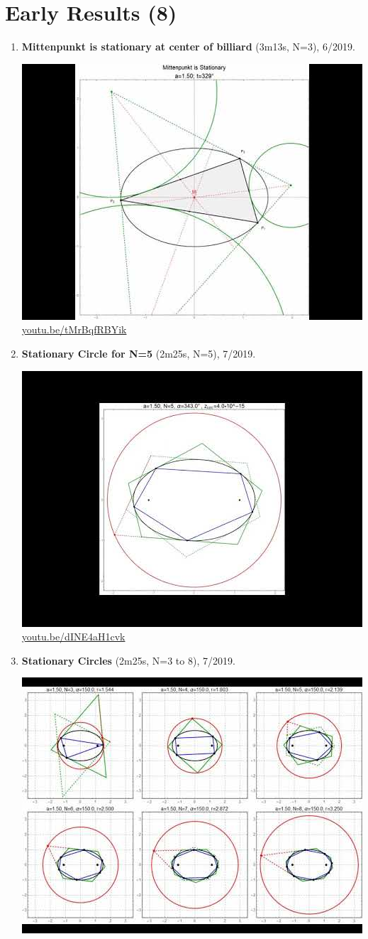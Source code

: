 \documentclass[12pt]{amsart}
\begin{document}
\section{Early Results (8)}

\begin{enumerate}[resume]
\item \textbf{Mittenpunkt is stationary at center of billiard} (3m13s, N=3), 6/2019. 
\begin{center}\includegraphics[width=.5\textwidth]{pics/tMrBqfRBYik.jpg} \\ 
\href{https://youtu.be/tMrBqfRBYik}{\url{youtu.be/tMrBqfRBYik}}\end{center}
% 
\item \textbf{Stationary Circle for N=5} (2m25s, N=5), 7/2019. 
\begin{center}\includegraphics[width=.5\textwidth]{pics/dINE4aH1cvk.jpg} \\ 
\href{https://youtu.be/dINE4aH1cvk}{\url{youtu.be/dINE4aH1cvk}}\end{center}
% 
\item \textbf{Stationary Circles} (2m25s, N=3 to 8), 7/2019. 
\begin{center}\includegraphics[width=.5\textwidth]{pics/EFeINGIDFrg.jpg} \\ 

\end{center}
\end{enumerate}
\end{document}
